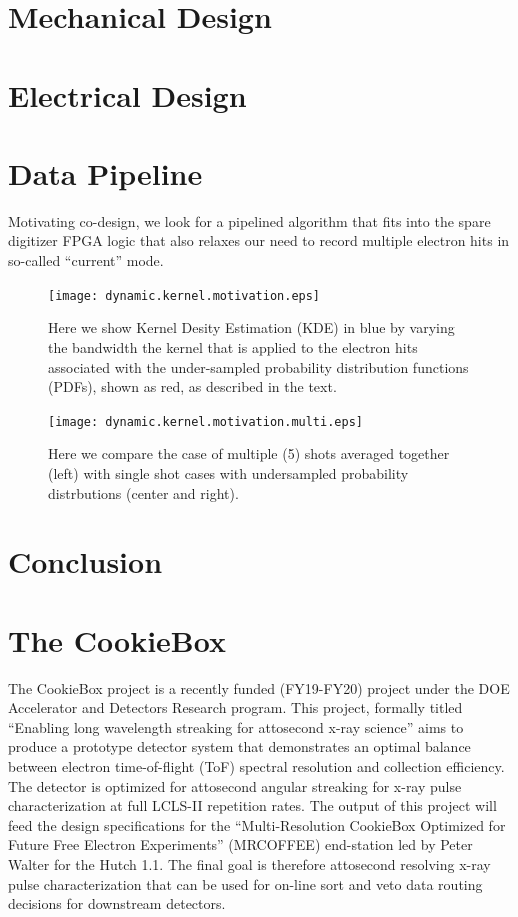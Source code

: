 \documentclass[aps]{revtex4}
\begin{document}
\section{Mechanical Design}
\section{Electrical Design}
\section{Data Pipeline}

Motivating co-design, we look for a pipelined algorithm that fits into the spare digitizer FPGA logic that also relaxes our need to record multiple electron hits in so-called ``current'' mode.

\begin{figure}
\centerline{\texttt{[image: dynamic.kernel.motivation.eps]}}
\caption{\label{fig::kde}
Here we show Kernel Desity Estimation (KDE) in blue by varying the bandwidth the kernel that is applied to the electron hits associated with the under-sampled probability distribution functions (PDFs), shown as red, as described in the text.
}
\end{figure}

\begin{figure}
\centerline{\texttt{[image: dynamic.kernel.motivation.multi.eps]}}
\caption{\label{fig::multi_single_kde}
Here we compare the case of multiple (5) shots averaged together (left) with single shot cases with undersampled probability distrbutions (center and right).
}
\end{figure}

\section{Conclusion}
\section*{The CookieBox}

The CookieBox project is a recently funded (FY19-FY20) project under the DOE Accelerator and Detectors Research program.
This project, formally titled ``Enabling long wavelength streaking for attosecond x-ray science'' aims to produce a prototype detector system that demonstrates an optimal balance between electron time-of-flight (ToF) spectral resolution and collection efficiency.
The detector is optimized for attosecond angular streaking \cite{Nick2018,Siqi2018} for x-ray pulse characterization at full LCLS-II repetition rates.
The output of this project will feed the design specifications for the ``Multi-Resolution CookieBox Optimized for Future Free Electron Experiments'' (MRCOFFEE) end-station led by Peter Walter for the Hutch 1.1.
The final goal is therefore attosecond resolving x-ray pulse characterization that can be used for on-line sort and veto data routing decisions for downstream detectors.
\end{document}
